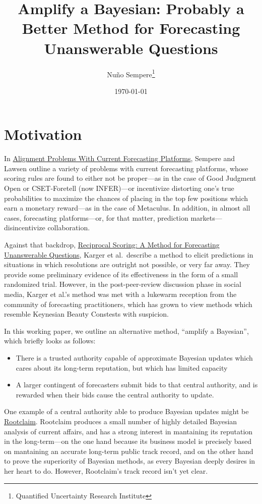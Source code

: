 \documentclass[]{article}
\title{Amplify a Bayesian: Probably a Better Method for Forecasting
Unanswerable Questions}
\author{Nuño Sempere\footnote{Quantified Uncertainty Research Institute}}
\date{\today}
\providecommand{\tightlist}{%
  \setlength{\itemsep}{0pt}\setlength{\parskip}{0pt}}
\begin{document}
\maketitle

\hypertarget{motivation}{%
\section{Motivation}\label{motivation}}

In \href{https://arxiv.org/abs/2106.11248}{Alignment Problems With
Current Forecasting Platforms}, Sempere and Lawsen outline a variety of
problems with current forecasting platforms, whose scoring rules are
found to either not be proper---as in the case of Good Judgment Open or
CSET-Foretell (now INFER)---or incentivize distorting one's true
probabilities to maximize the chances of placing in the top few
positions which earn a monetary reward---as in the case of Metaculus. In
addition, in almost all cases, forecasting platforms---or, for that
matter, prediction markets---disincentivize collaboration.

Against that backdrop,
\href{https://papers.ssrn.com/sol3/papers.cfm?abstract_id=3954498}{Reciprocal
Scoring: A Method for Forecasting Unanswerable Questions}, Karger et
al.~describe a method to elicit predictions in situations in which
resolutions are outright not possible, or very far away. They provide
some preliminary evidence of its effectiveness in the form of a small
randomized trial. However, in the post-peer-review discussion phase in
social media, Karger et al.'s method was met with a lukewarm reception
from the community of forecasting practitioners, which has grown to view
methods which resemble Keynesian Beauty Constests with suspicion.

In this working paper, we outline an alternative method, ``amplify a
Bayesian'', which briefly looks as follows:

\begin{itemize}
\tightlist
\item
  There is a trusted authority capable of approximate Bayesian updates
  which cares about its long-term reputation, but which has limited
  capacity
\item
  A larger contingent of forecasters submit bids to that central
  authority, and is rewarded when their bids cause the central authority
  to update.
\end{itemize}

One example of a central authority able to produce Bayesian updates
might be \href{https://www.rootclaim.com/}{Rootclaim}. Rootclaim
produces a small number of highly detailed Bayesian analysis of current
affairs, and has a strong interest in mantaining its reputation in the
long-term---on the one hand because its business model is precisely
based on mantaining an accurate long-term public track record, and on
the other hand to prove the superiority of Bayesian methods, as every
Bayesian deeply desires in her heart to do. However, Rootclaim's track
record isn't yet clear.
\end{document}
